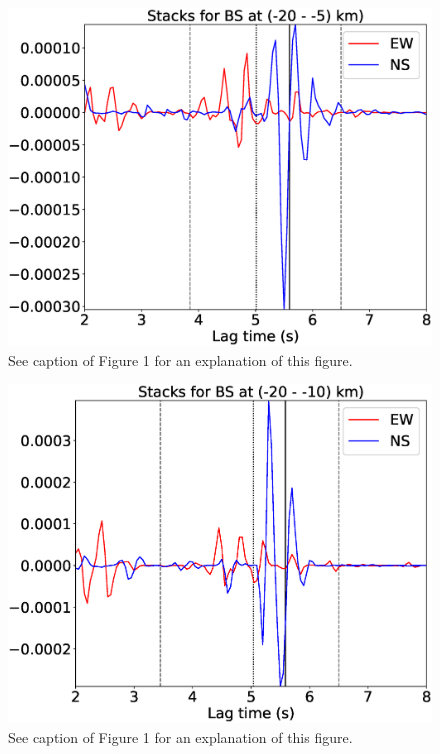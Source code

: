 \documentclass[letterpaper, 12pt]{article}
\begin{document}
\begin{figure}[H]
\includegraphics[width=\linewidth]{figures/intervals/BS_-20_-05_stacks.eps}
\caption{See caption of Figure 1 for an explanation of this figure.}
\end{figure}

\begin{figure}[H]
\includegraphics[width=\linewidth]{figures/intervals/BS_-20_-10_stacks.eps}
\caption{See caption of Figure 1 for an explanation of this figure.}
\end{figure}
\end{document}
